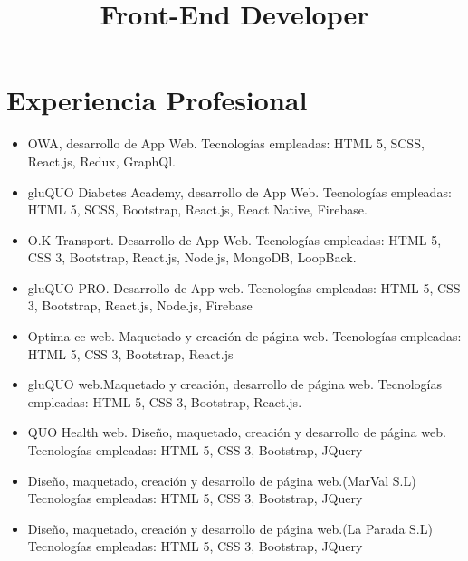 \documentclass[11pt,a4paper]{moderncv}
\title{Front-End Developer}
\begin{document}
    \maketitle
    \section{Experiencia Profesional}
    {\begin{itemize}
         \item OWA, desarrollo de App Web. Tecnologías empleadas: HTML 5, SCSS, React.js, Redux, GraphQl.
    \end{itemize}
    }
    {\begin{itemize}
         \item gluQUO Diabetes Academy, desarrollo de App Web. Tecnologías empleadas: HTML 5, SCSS, Bootstrap, React.js, React Native, Firebase.
         \item O.K Transport. Desarrollo de App Web. Tecnologías empleadas: HTML 5, CSS 3, Bootstrap, React.js, Node.js, MongoDB, LoopBack.
         \item gluQUO PRO. Desarrollo de App web. Tecnologías empleadas: HTML 5, CSS 3, Bootstrap, React.js, Node.js, Firebase
         \item Optima cc web. Maquetado y creación de página web. Tecnologías empleadas: HTML 5, CSS 3, Bootstrap, React.js
         \item gluQUO web.Maquetado y creación, desarrollo de página web. Tecnologías empleadas: HTML 5, CSS 3, Bootstrap, React.js.
         \item QUO Health web. Diseño, maquetado, creación y desarrollo de página web. Tecnologías empleadas: HTML 5, CSS 3, Bootstrap, JQuery
    \end{itemize}
    }
    {
    \begin{itemize}
        \item Diseño, maquetado, creación y desarrollo de página web.(MarVal S.L) Tecnologías empleadas: HTML 5, CSS 3, Bootstrap, JQuery
    \end{itemize}
    \begin{itemize}
        \item Diseño, maquetado, creación y desarrollo de página web.(La Parada S.L) Tecnologías empleadas: HTML 5, CSS 3, Bootstrap, JQuery
    \end{itemize}
    }
\end{document}
